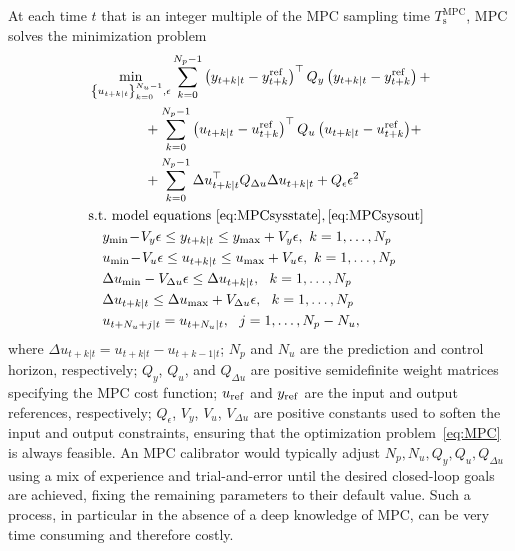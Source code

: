 \documentclass{article}
\newcommand{\TMPC}{T_{\mathrm{s}}^{\mathrm{MPC}}}
\newcommand{\Nu}{N_u}
\newcommand{\Nc}{\Nu}
\newcommand{\Np}{N_p}
\begin{document}
At each time $t$ that is an integer multiple of the MPC sampling time $\TMPC$,  MPC solves the  minimization problem
\begin{subequations}  \label{eq:MPC}
	\begin{align}
	&  \nonumber \min_{\left\{u_{t+k|t}\right\}_{k=0}^{\Nu-1}, \epsilon}  \sum_{k=0}^{\Np-1} \left(y_{t+k|t}-y^{\rm{ref}}_{t+k}\right)^\top Q_y\left(y_{t+k|t}-y^{\rm{ref}}_{t+k}\right) +\\ 
	& \nonumber \qquad \qquad+\sum_{k=0}^{\Np-1} \left(u_{t+k|t}-u^{\rm ref}_{t+k}\right)^\top  Q_u \left(u_{t+k|t}-u^{\rm ref}_{t+k}\right) \!+\!\\
	&\qquad \qquad + \sum_{k=0}^{\Np-1} \Delta u_{t+k|t}^\top Q_{\Delta u} \Delta u_{t+k|t}  + Q_\epsilon \epsilon^2 \label{eq:MPCcost}\\%
	&  \mathrm{s.t. \ }   \text{model equations } \eqref{eq:MPCsysstate},\eqref{eq:MPCsysout} \\
	& \quad y_{\mathrm{min}} \!-\! V_y\epsilon\leq y_{t+k|t} \leq  y_{\mathrm{max}}+V_y\epsilon, \  k=1,\ldots,\Np  \\
	& \quad   u_{\mathrm{min}}\!-\!V_u\epsilon \leq u_{t+k|t} \leq  u_{\mathrm{max}}+V_u\epsilon, \  k=1,\ldots,\Np \\
	& \quad  \Delta u_{\mathrm{min}} -V_{\Delta u}\epsilon \leq \Delta u_{t+k|t}, \ \    k=1,\ldots,\Np \label{eq:MPC:Ducons1}  \\
	& \quad    \Delta u_{t+k|t} \leq  \Delta u_{\mathrm{max}}+V_{\Delta u}\epsilon, \ \  k=1,\ldots,\Np \label{eq:MPC:Ducons2}\\ %
	& \quad  u_{t+\Nu+j|t}= u_{t+\Nu|t},  \ \  j=1,\ldots, \Np-\Nu, \label{eq:MPCconst}
 	\end{align}
\end{subequations}
where $\Delta u_{t+k|t} =  u_{t+k|t}- u_{t+k-1|t}$;  $\Np$ and $\Nu$ are the prediction and control horizon, respectively; $Q_{y}$, $Q_{u}$, and  $Q_{\Delta u}$ are positive semidefinite weight matrices specifying the MPC cost function; $u_{\rm ref}$ and $y_{\rm ref}$ are the input and output references, respectively;  $Q_{\epsilon}$, $V_y$, $V_u$, $V_{\Delta u}$ are positive constants used to soften the input and output constraints, ensuring that the optimization problem~\eqref{eq:MPC} is always feasible. 
An MPC calibrator would typically adjust $\Np,\Nc, Q_y, Q_u, Q_{\Delta u}$ using a mix of experience and trial-and-error until the desired closed-loop goals are achieved,
fixing the remaining parameters to their default value.
Such a process, in particular in the absence of a deep knowledge of MPC, can be very time consuming and therefore costly.
\end{document}
